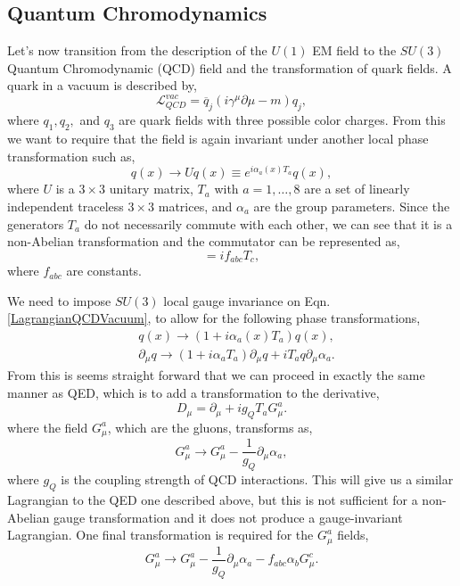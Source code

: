 \subsection{Quantum Chromodynamics}

Let's now transition from the description of the $U(1)$ EM field to the $SU(3)$ Quantum Chromodynamic (QCD) field and the transformation of quark fields. A quark in a vacuum is described by,
\begin{equation}\label{LagrangianQCDVacuum}
\mathcal{L}_{QCD}^{vac}=\overline{q}_j(i\gamma^\mu\partial\mu-m)q_j,
\end{equation}
where $q_1, q_2,$ and $q_3$ are quark fields with three possible color charges. From this we want to require that the field is again invariant under another local phase transformation such as,
\begin{equation}
q(x)\rightarrow Uq(x)\equiv e^{i\alpha_a(x)T_a}q(x),
\end{equation}
where $U$ is a $3\times3$ unitary matrix, $T_a$ with $a=1,\ldots,8$ are a set of linearly independent traceless $3\times3$ matrices, and $\alpha_a$ are the group parameters. Since the generators $T_a$ do not necessarily commute with each other, we can see that it is a non-Abelian transformation and the commutator can be represented as,
\begin{equation}
[T_a, T_b]=if_{abc}T_c,
\end{equation}
where $f_{abc}$ are constants. 

We need to impose $SU(3)$ local gauge invariance on Eqn. \ref{LagrangianQCDVacuum}, to allow for the following phase transformations,
\begin{equation}
\begin{split}
& q(x)\rightarrow(1+i\alpha_a(x)T_a)q(x), \\
& \partial_\mu q\rightarrow(1+i\alpha_aT_a)\partial_\mu q+iT_aq\partial_\mu\alpha_a.
\end{split}
\end{equation}
From this is seems straight forward that we can proceed in exactly the same manner as QED, which is to add a transformation to the derivative,
\begin{equation}
D_\mu=\partial_\mu+ig_Q T_aG_\mu^a.
\end{equation}
where the field $G_\mu^a$, which are the gluons, transforms as, 
\begin{equation}
G_\mu^a\rightarrow G_\mu^a-\frac{1}{g_Q}\partial_\mu\alpha_a,
\end{equation}
where $g_Q$ is the coupling strength of QCD interactions. This will give us a similar Lagrangian to the QED one described above, but this is not sufficient for a non-Abelian gauge transformation and it does not produce a gauge-invariant Lagrangian. One final transformation is required for the $G_\mu^a$ fields, 
\begin{equation}\label{QCDGaugeTransform}
G_\mu^a\rightarrow G_\mu^a-\frac{1}{g_Q}\partial_\mu\alpha_a-f_{abc}\alpha_b G_\mu^c.
\end{equation}

